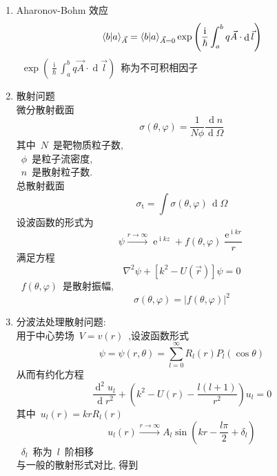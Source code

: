 \documentclass[11pt,a4paper,twocolumn,fleqn]{article}%
\DeclareMathOperator{\dif}{d}
\DeclareMathOperator{\diff}{\, d}
\DeclareMathOperator{\mi}{i}
\DeclareMathOperator{\e}{e}%
\renewcommand{\[}{~$}
\renewcommand{\]}{$~}%
\begin{document}
\begin{enumerate}
  \item Aharonov-Bohm 效应
  	\begin{equation}
  	 \braket{b|a}_{\vec A} = \braket{b|a}_{\vec A = 0}\exp\left(\frac{\mi}{\hbar}\int_a^b q\vec A\cdot\dif\vec l\right)
  	\end{equation}
  	\[\exp\left(\frac{\mi}{\hbar}\int_a^b q\vec A\cdot\dif\vec l\right)\]称为不可积相因子
  \item 散射问题\\
  	微分散射截面
  	\begin{equation}
  	 \sigma (\theta,\varphi) = \frac{1}{N\phi}\frac{\dif n}{\dif \Omega}
  	\end{equation}
  	其中\[N\]是靶物质粒子数, \\
  	\[\phi\]是粒子流密度,\\
  	\[n\]是散射粒子数.\\
  	总散射截面
  	\begin{equation}
  	 \sigma_{\mathrm{t}} = \int\sigma(\theta,\varphi)\diff \Omega
  	\end{equation}
  	设波函数的形式为
  	\begin{equation}
  	 \psi\overset{r\to\infty}{\longrightarrow}\e^{\mi k z} + f(\theta,\varphi)\frac{\e^{\mi k r}}{r}
  	\end{equation}
  	满足方程
  	\begin{equation}
  	 \nabla^2\psi + [k^2 - U(\vec r)]\psi = 0
  	\end{equation}
  	\[f(\theta,\varphi)\]是散射振幅, 
  	\begin{equation}
  	 \sigma(\theta,\varphi) = |f(\theta,\varphi)|^2
  	\end{equation}
  \item 分波法处理散射问题:\\
  	用于中心势场\[V = v(r)\],设波函数形式
  	\begin{equation}
  	 \psi = \psi(r,\theta ) = \sum_{l=0}^\infty R_l(r)P_l(\cos\theta)
  	\end{equation}
  	从而有约化方程
  	\begin{equation}
  	 \frac{\dif^2 u_l}{\dif r^2} + \left(k^2 - U(r) - \frac{l(l+1)}{r^2}\right)u_l = 0
  	\end{equation}
  	其中\[u_l(r) = krR_l(r)\]
  	\begin{equation}
  	 u_l(r) \overset{r\to\infty}{\longrightarrow} A_l\sin\left(kr - \frac{l\pi}{2}+\delta_l\right)
  	\end{equation}
  	\[\delta_l\]称为\[l\]阶相移\\
  	与一般的散射形式对比, 得到

\end{enumerate}
\end{document}
